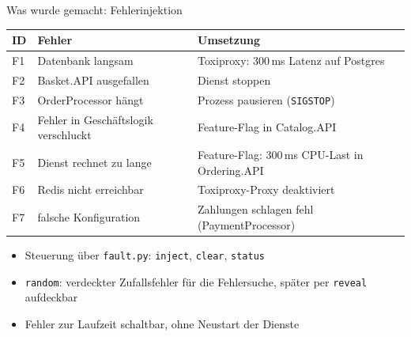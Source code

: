 \documentclass[10pt, aspectratio=169]{beamer}
\begin{document}
\begin{frame}{Was wurde gemacht: Fehlerinjektion}
  \small
  \begin{tabularx}{\textwidth}{@{}l l X@{}}
    \toprule
    \textbf{ID} & \textbf{Fehler} & \textbf{Umsetzung} \\
    \midrule
    F1 & Datenbank langsam              & Toxiproxy: 300\,ms Latenz auf Postgres \\
    F2 & Basket.API ausgefallen         & Dienst stoppen \\
    F3 & OrderProcessor hängt           & Prozess pausieren (\texttt{SIGSTOP}) \\
    F4 & Fehler in Geschäftslogik verschluckt & Feature-Flag in Catalog.API \\
    F5 & Dienst rechnet zu lange        & Feature-Flag: 300\,ms CPU-Last in Ordering.API \\
    F6 & Redis nicht erreichbar         & Toxiproxy-Proxy deaktiviert \\
    F7 & falsche Konfiguration          & Zahlungen schlagen fehl (PaymentProcessor) \\
    \bottomrule
  \end{tabularx}

  \vspace{0.5cm}
  \begin{itemize}
    \item Steuerung über \texttt{fault.py}: \texttt{inject}, \texttt{clear}, \texttt{status}
    \item \texttt{random}: verdeckter Zufallsfehler für die Fehlersuche, später per \texttt{reveal} aufdeckbar
    \item Fehler zur Laufzeit schaltbar, ohne Neustart der Dienste
  \end{itemize}
\end{frame}
\end{document}
